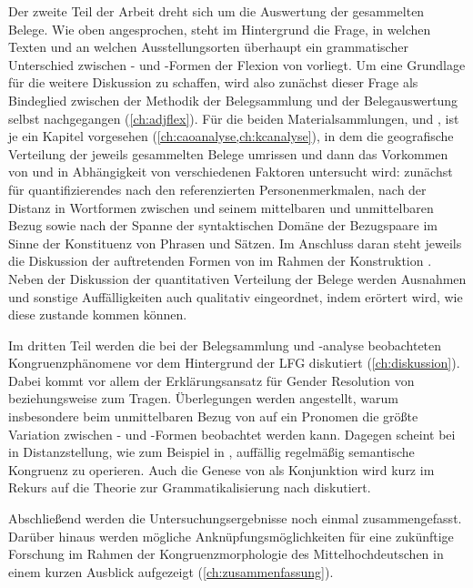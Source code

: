 Der zweite Teil der Arbeit dreht sich um die Auswertung der gesammelten Belege.
Wie oben angesprochen, steht im Hintergrund die Frage, in welchen Texten und an
welchen Ausstellungs\-orten überhaupt ein grammatischer Unterschied zwischen
- und -Formen der Flexion von  vorliegt. Um eine
Grundlage für die weitere Diskussion zu schaffen, wird also zunächst dieser
Frage als Bindeglied zwischen der Methodik der Belegsammlung und der
Belegauswertung selbst nachgegangen (\cref{ch:adjflex}). Für die beiden
Materialsammlungen, \CAO{} und \KC{}, ist je ein Kapitel
vorgesehen (\cref{ch:caoanalyse,ch:kcanalyse}), in dem die geografische
Verteilung der jeweils gesammelten Belege umrissen und dann das Vorkommen von
 und  in Abhängigkeit von verschiedenen Faktoren
untersucht wird: zunächst für quantifizierendes  nach den
referenzierten Personenmerkmalen, nach der Distanz in Wortformen zwischen
 und seinem mittelbaren und unmittelbaren Bezug sowie nach der
Spanne der syntaktischen Domäne der Bezugspaare im Sinne der Konstituenz von
Phrasen und Sätzen. Im Anschluss daran steht jeweils die Diskussion der
auftretenden Formen von  im Rahmen der Konstruktion
. Neben der Diskussion der quantitativen Verteilung der
Belege werden Ausnahmen und sonstige Auffälligkeiten auch qualitativ
eingeordnet, indem erörtert wird, wie diese zustande kommen können.

Im dritten Teil werden die bei der Belegsammlung und -analyse beobachteten
Kongruenzphänomene vor dem Hintergrund der LFG diskutiert
(\cref{ch:diskussion}). Dabei kommt vor allem der Erklärungsansatz für Gender
Resolution von \citet[Kapitel~8]{wechslerzlatic2003} beziehungsweise
\citet{wechsler2009} zum Tragen. Überlegungen werden angestellt, warum
insbesondere beim unmittelbaren Bezug von  auf ein Pronomen die
größte Variation zwischen - und -\allowbreak{}Formen
beobachtet werden kann. Dagegen scheint bei  in
Dis\-tanz\-stellung, wie zum Beispiel in , auffällig regelmäßig semantische Kongruenz zu operieren.
Auch die Genese von  als Konjunktion wird kurz im Rekurs auf die
Theorie zur Grammatikalisierung nach \citet{lehmann2015} diskutiert.

Abschließend werden die Untersuchungsergebnisse noch einmal zusammengefasst.
Darüber hinaus werden mögliche Anknüpfungsmöglichkeiten für eine zukünftige
Forschung im Rahmen der Kongruenzmorphologie des Mittel\-hoch\-deutschen in
einem kurzen Ausblick aufgezeigt (\cref{ch:zusammenfassung}).
